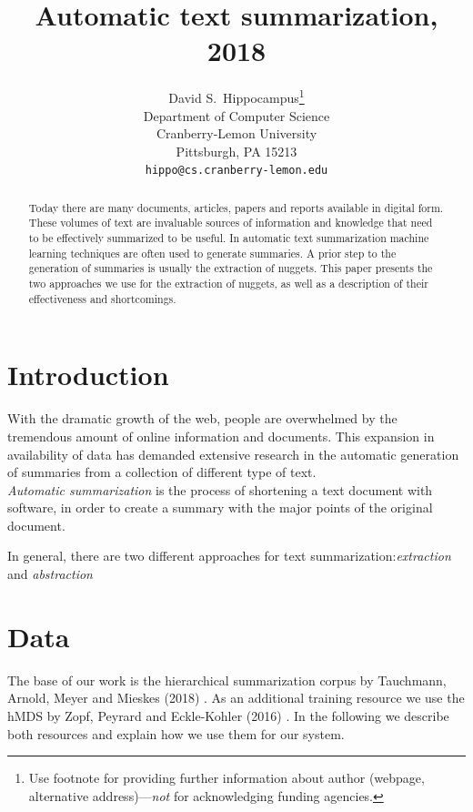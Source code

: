 \documentclass{article}
\title{Automatic text summarization, 2018}
\author{
  David S.~Hippocampus\thanks{Use footnote for providing further
    information about author (webpage, alternative
    address)---\emph{not} for acknowledging funding agencies.} \\
  Department of Computer Science\\
  Cranberry-Lemon University\\
  Pittsburgh, PA 15213 \\
  \texttt{hippo@cs.cranberry-lemon.edu} \\
}
\begin{document}

\maketitle

\begin{abstract}
  Today there are many documents, articles, papers and reports available in digital form. These volumes of text are invaluable sources of information and knowledge that need to be effectively summarized to be useful. In automatic text summarization machine learning techniques are often used to generate summaries. A prior step to the generation of summaries is usually the extraction of nuggets. This paper presents the two approaches we use for the extraction of nuggets, as well as a description of their effectiveness and shortcomings. 
  
\end{abstract}

\section{Introduction}
\label{sec:intro}

With the dramatic growth of the web, people are overwhelmed by the tremendous amount of online information and documents. This expansion in availability of data has demanded extensive research in the automatic generation of summaries from a collection of different type of text.\\

\textit{Automatic summarization} is the process of shortening a text document with software, in order to create a summary with the major points of the original document.	     

In general, there  are two different approaches for text summarization:\textit{extraction} and \textit{abstraction}

\section{Data}
\label{sec:data}

The base of our work is the hierarchical summarization corpus by Tauchmann, Arnold, Meyer and Mieskes (2018) \citep{TAUCHMANN18.252}. As an additional training resource we use the hMDS by Zopf, Peyrard and Eckle-Kohler (2016) \citep{tubiblio97941}. In the following we describe both resources and explain how we use them for our system.
\end{document}
